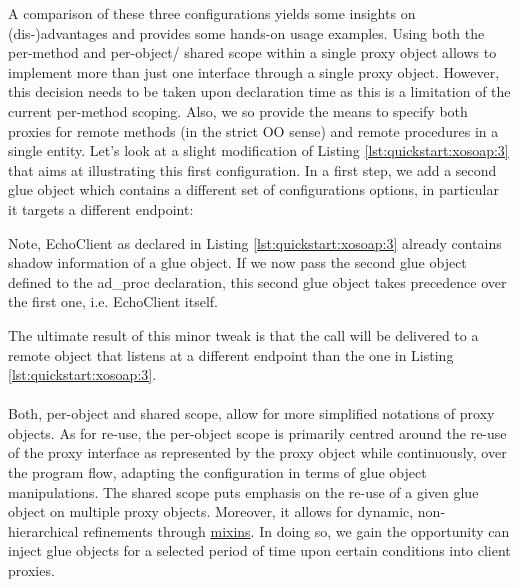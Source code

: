 A comparison of these three configurations yields some insights on (dis-)advantages and provides some  hands-on usage examples. Using both the per-method and per-object/ shared scope within a single proxy object allows to implement more than just one interface through a single proxy object. However, this decision needs to be taken upon declaration time as this is a limitation of the current per-method scoping. Also, we so provide the means to specify both proxies for remote methods (in the strict OO sense) and remote procedures in a single entity. Let's look at a slight modification of Listing \ref{lst:quickstart:xosoap:3} that aims at illustrating this first configuration. In a first step, we add a second glue object which contains a different set of configurations options, in particular it targets a different endpoint:
%
\lstset{breaklines=true,numbers=left,basicstyle=\footnotesize,frame=single,tabsize=2}
%


%
Note, EchoClient as declared in Listing \ref{lst:quickstart:xosoap:3} already contains shadow information of a glue object. If we now pass the second glue object defined to the ad\_proc declaration, this second glue object takes precedence over the first one, i.e. EchoClient itself.
%
%

%
The ultimate result of this minor tweak is that the call will be delivered to a remote object that listens at a different endpoint than the one in Listing \ref{lst:quickstart:xosoap:3}.\\\\
Both, per-object and shared scope, allow for more simplified notations of proxy objects.  As for re-use, the per-object scope is primarily centred around the re-use of the proxy interface as represented by the proxy object while continuously, over the program flow, adapting the configuration in terms of glue object manipulations. The shared scope puts emphasis on the re-use of a given glue object on multiple proxy objects. Moreover, it allows for dynamic, non-hierarchical refinements through \href{http://media.wu-wien.ac.at/doc/tutorial.html#mixins}{mixins}. In doing so, we gain the opportunity can inject glue objects for a selected period of time upon certain conditions into client proxies. 

